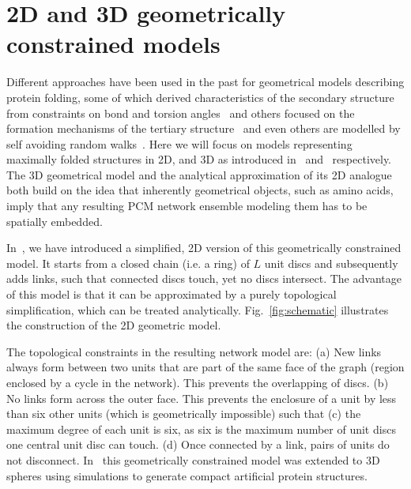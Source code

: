 \documentclass[
reprint,
twocolumn,
amsmath,amssymb,superscriptaddress,aps,
pre]{revtex4-1}
\begin{document}
\section{2D and 3D geometrically constrained models}
\label{sec:models}
Different approaches have been used in the past for geometrical models describing protein folding, some of which derived characteristics of the secondary structure from constraints on bond and torsion angles~\cite{bhattacharjee2013flory,Danielsson2010,Molkenthin2011} and others focused on the formation mechanisms of the tertiary structure~\cite{molkenthin2016scaling, molkenthin2020self} and even others are modelled by self avoiding random walks~\cite{mey2014rareevent, hills2009insights}. Here we will focus on models representing maximally folded structures in 2D, and 3D as introduced in~\cite{molkenthin2016scaling} and~\cite{molkenthin2020self} respectively. The 3D geometrical model and the analytical approximation of its 2D analogue both build on the idea that inherently geometrical objects, such as amino acids, imply that any resulting PCM network ensemble modeling them has to be spatially embedded. 

In~\cite{molkenthin2016scaling}, we have introduced a simplified, 2D version of this geometrically constrained model. It starts from a closed chain (i.e. a ring) of $L$ unit discs and subsequently adds links, such that connected discs touch, yet no discs intersect. The advantage of this model is that it can be approximated by a purely topological simplification, which can be treated analytically. Fig.~\ref{fig:schematic} illustrates the construction of the 2D geometric model.

The topological constraints in the resulting network model are:
(a) New links always form between two units that are part of the same face of the graph (region enclosed by a cycle in the network). This prevents the overlapping of discs. (b) No links form across the outer face. This prevents the enclosure of a unit by less than six other units (which is geometrically impossible) such that (c) the maximum degree of each unit is six, as six is the maximum number of unit discs one central unit disc can touch. (d) Once connected by a link, pairs of units do not disconnect. In~\cite{molkenthin2020self} this geometrically constrained model was extended to 3D spheres using simulations to generate compact artificial protein structures. 
\end{document}

